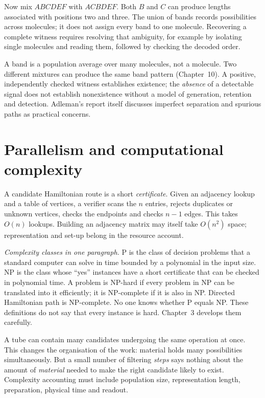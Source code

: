 Now mix $ABCDEF$ with $ACBDEF$. Both $B$ and $C$ can produce lengths associated
with positions two and three. The union of bands records possibilities across
molecules; it does not assign every band to one molecule. Recovering a complete
witness requires resolving that ambiguity, for example by isolating single
molecules and reading them, followed by checking the decoded order.

\begin{Pitfall}
A band is a population average over many molecules, not a molecule. Two
different mixtures can produce the same band pattern (Chapter~10). A positive,
independently checked witness establishes existence; the \emph{absence} of a
detectable signal does not establish nonexistence without a model of generation,
retention and detection. Adleman's report itself discusses imperfect separation
and spurious paths as practical concerns.\cite{Adleman1994}
\end{Pitfall}

\section{Parallelism and computational complexity}\label{sec:complexity}
A candidate Hamiltonian route is a short \emph{certificate}. Given an adjacency
lookup and a table of vertices, a verifier scans the $n$ entries, rejects
duplicates or unknown vertices, checks the endpoints and checks $n-1$ edges. This
takes $O(n)$ lookups. Building an adjacency matrix may itself take $O(n^2)$ space;
representation and set-up belong in the resource account.

\begin{CSBridge}
\emph{Complexity classes in one paragraph.} P is the class of decision problems
that a standard computer can solve in time bounded by a polynomial in the input
size. NP is the class whose ``yes'' instances have a short certificate that can
be checked in polynomial time. A problem is NP-hard if every problem in NP can
be translated into it efficiently; it is NP-complete if it is also in NP.
Directed Hamiltonian path is NP-complete.\cite{PfenningHamilton} No one knows
whether P equals NP. These definitions do not say that every instance is hard.
Chapter~3 develops them carefully.
\end{CSBridge}

A tube can contain many candidates undergoing the same operation at once. This
changes the organisation of the work: material holds many possibilities
simultaneously. But a small number of filtering \emph{steps} says nothing about
the amount of \emph{material} needed to make the right candidate likely to exist.
Complexity accounting must include population size, representation length,
preparation, physical time and readout.

